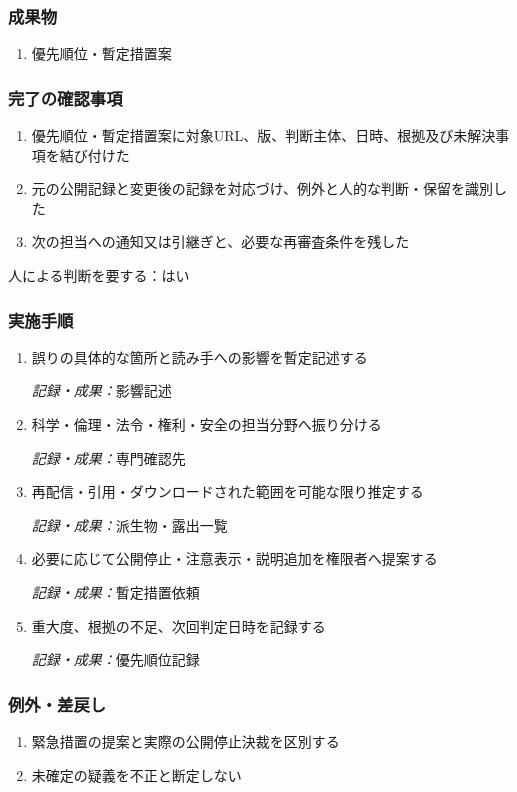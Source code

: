 \documentclass[a4paper,11pt]{article}
\begin{document}
\subsubsection*{成果物}
\begin{enumerate}[leftmargin=2em,itemsep=0.35em]
\item 優先順位・暫定措置案
\end{enumerate}
\subsubsection*{完了の確認事項}
\begin{enumerate}[leftmargin=2em,itemsep=0.35em]
\item 優先順位・暫定措置案に対象URL、版、判断主体、日時、根拠及び未解決事項を結び付けた
\item 元の公開記録と変更後の記録を対応づけ、例外と人的な判断・保留を識別した
\item 次の担当への通知又は引継ぎと、必要な再審査条件を残した
\end{enumerate}
\par 人による判断を要する：はい\par\medskip
\subsubsection*{実施手順}
\begin{enumerate}[leftmargin=2em,itemsep=0.65em]
\item 誤りの具体的な箇所と読み手への影響を暫定記述する\par\noindent\textit{記録・成果：}影響記述\nobreak\smallskip
\item 科学・倫理・法令・権利・安全の担当分野へ振り分ける\par\noindent\textit{記録・成果：}専門確認先\nobreak\smallskip
\item 再配信・引用・ダウンロードされた範囲を可能な限り推定する\par\noindent\textit{記録・成果：}派生物・露出一覧\nobreak\smallskip
\item 必要に応じて公開停止・注意表示・説明追加を権限者へ提案する\par\noindent\textit{記録・成果：}暫定措置依頼\nobreak\smallskip
\item 重大度、根拠の不足、次回判定日時を記録する\par\noindent\textit{記録・成果：}優先順位記録\nobreak\smallskip
\end{enumerate}
\subsubsection*{例外・差戻し}
\begin{enumerate}[leftmargin=2em,itemsep=0.35em]
\item 緊急措置の提案と実際の公開停止決裁を区別する
\item 未確定の疑義を不正と断定しない
\end{enumerate}
\end{document}
